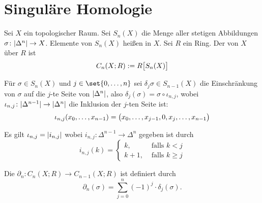 \newpage

\section{Singuläre Homologie} %
\label{sec:5}

\begin{definition}[{name=[{Singuläre Simplizes und $n$-ter singulärer Kettenmodul}]}]
	Sei $X$ ein topologischer Raum. 
	Sei $S_n(X)$ die Menge aller stetigen Abbildungen $\sigma \colon \abs*{\Delta^n} \to X$. 
	Elemente von $S_n(X)$ heißen  in $X$. 
	Sei $R$ ein Ring. 
	Der  von $X$ über $R$ ist
	\[
		C_n(X;R) := R \benbrace[\big]{S_n(X)} 
	\]
\end{definition}

\begin{definition}[{name=[{Einschränkung eines singulären Simplizes auf eine Seite}]},label=def:52]
	Für $\sigma \in S_n(X)$ und $j \in \set{0,\ldots ,n}$ sei $\delta_j \sigma \in S_{n-1}(X)$ die Einschränkung von $\sigma$ auf die $j$-te Seite von $\abs*{\Delta^n}$, also $\delta_j(\sigma) = \sigma \circ \iota_{n,j}$, wobei $\iota_{n,j} \colon \abs{\Delta^{n-1}} \to \abs*{\Delta^n}$ die Inklusion der $j$-ten Seite ist:
	\[
		\iota_{n,j}(x_0, \ldots ,x_{n-1}) = \enbrace[\big]{x_0, \ldots , x_{j-1}, 0, x_j, \ldots , x_{n-1}}
	\]
\end{definition}

\begin{bemerkung}[{name=[{Inklusion der $j$-ten Seite}]}]
	Es gilt $\iota_{n,j} = \abs*{i_{n,j}}$ wobei $i_{n,j} \colon \Delta^{n-1} \to \Delta^n$ gegeben ist durch 
	\[
		i_{n,j}(k) = \begin{cases}
		k, &\text{ falls }k < j\\
		k+1, &\text{ falls } k\ge j
	\end{cases}
	\]
\end{bemerkung}

\begin{definition}[{name=[{$n$-te singuläre Randabbildung}]}]
	Die  $\partial_n \colon C_n(X;R) \to C_{n-1}(X;R)$ ist 
	definiert durch 
	\[
		\partial_n(\sigma) = \sum_{j=0}^{n} (-1)^j \cdot \delta_j(\sigma).
	\]
\end{definition}

